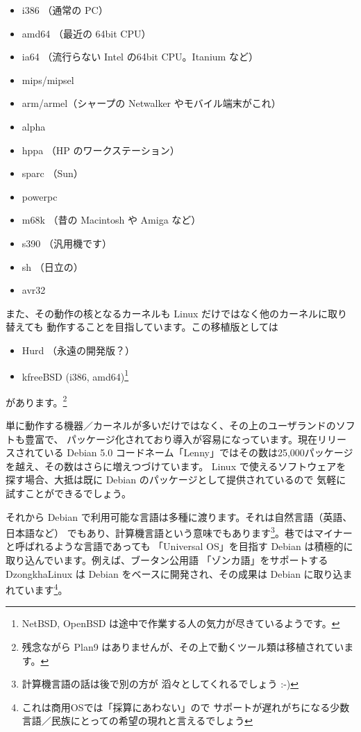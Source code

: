 \documentclass[mingoth,a4paper]{jsarticle}
\begin{document}
\begin{minipage}[t]{0.45\hsize}
\begin{itemize}
 \item i386	（通常の PC）
 \item amd64	（最近の 64bit CPU）
 \item ia64	（流行らない Intel の64bit CPU。Itanium など）
 \item mips/mipsel
 \item arm/armel（シャープの Netwalker やモバイル端末がこれ）
 \item alpha
\end{itemize}
\end{minipage}
\begin{minipage}[t]{0.45\hsize}
\begin{itemize}
 \item hppa	（HP のワークステーション）
 \item sparc	（Sun）
 \item powerpc
 \item m68k	（昔の Macintosh や Amiga など）
 \item s390 	（汎用機です）
 \item sh	（日立の）
 \item avr32
\end{itemize}
\end{minipage}

また、その動作の核となるカーネルも Linux だけではなく他のカーネルに取り替えても
動作することを目指しています。この移植版としては

\begin{itemize}
 \item Hurd	（永遠の開発版？）
 \item kfreeBSD (i386, amd64)\footnote{NetBSD, OpenBSD は途中で作業する人の気力が尽きているようです。}
\end{itemize}

があります。\footnote{残念ながら Plan9 はありませんが、その上で動くツール類は移植されています。}

単に動作する機器／カーネルが多いだけではなく、その上のユーザランドのソフトも豊富で、
パッケージ化されており導入が容易になっています。現在リリースされている Debian 5.0 
コードネーム「Lenny」ではその数は25,000パッケージを越え、その数はさらに増えつづけています。
Linux で使えるソフトウェアを探す場合、大抵は既に Debian のパッケージとして提供されているので
気軽に試すことができるでしょう。

それから Debian で利用可能な言語は多種に渡ります。それは自然言語（英語、日本語など）
でもあり、計算機言語という意味でもあります\footnote{計算機言語の話は後で別の方が
滔々としてくれるでしょう :-)}。巷ではマイナーと呼ばれるような言語であっても
「Universal OS」を目指す Debian は積極的に取り込んでいます。例えば、ブータン公用語
「ゾンカ語」をサポートする DzongkhaLinux は Debian をベースに開発され、その成果は 
Debian に取り込まれています\footnote{これは商用OSでは「採算にあわない」ので
サポートが遅れがちになる少数言語／民族にとっての希望の現れと言えるでしょう}。
\end{document}
